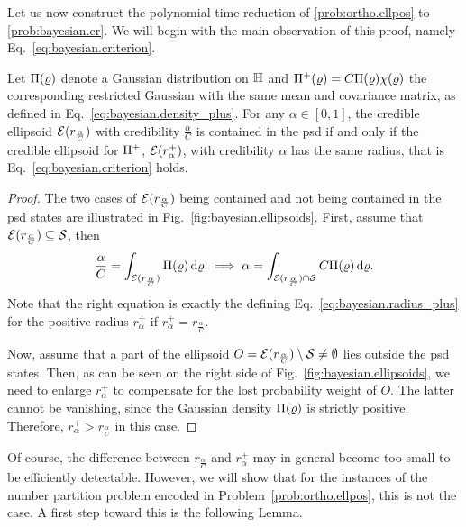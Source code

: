Let us now construct the polynomial time reduction of \cref{prob:ortho.ellpos} to \cref{prob:bayesian.cr}.
We will begin with the main observation of this proof, namely Eq.~\eqref{eq:bayesian.criterion}.
\begin{lemma}\label{lem:bayesian.criterion}
  Let $\Pi(\varrho)$ denote a Gaussian distribution on $\mathbb{H}$ and $\Pi^+(\varrho) = C \Pi(\varrho) \chi(\varrho)$ the corresponding restricted Gaussian with the same mean and covariance matrix, as defined in Eq.~\eqref{eq:bayesian.density_plus}.
  For any $\alpha \in [0,1]$, the credible ellipsoid $\mathcal{E}(r_\frac{\alpha}{C})$ with credibility $\frac{\alpha}{C}$ is contained in the psd if and only if the credible ellipsoid for $\Pi^+$, $\mathcal{E}(r^+_{\alpha})$, with credibility $\alpha$ has the same radius, that is Eq.~\eqref{eq:bayesian.criterion} holds.
\end{lemma}
\begin{proof}
  The two cases of  $\mathcal{E}(r_\frac{\alpha}{C})$ being contained and not being contained in the psd states are illustrated in Fig.~\ref{fig:bayesian.ellipsoids}.
  First, assume that $\mathcal{E}(r_\frac{\alpha}{C}) \subseteq \mathcal{S}$, then
  \[
    \frac{\alpha}{C} = \int_{\mathcal{E}(r_\frac{\alpha}{C})} \Pi(\varrho) \, \mathrm{d} \varrho.
    \implies
    \alpha = \int_{\mathcal{E}(r_\frac{\alpha}{C}) \cap \mathcal{S} } C \Pi(\varrho) \, \mathrm{d} \varrho.
  \]
  Note that the right equation is exactly the defining Eq.~\eqref{eq:bayesian.radius_plus} for the positive radius $r^+_{\alpha}$ if $r^+_\alpha = r_\frac{\alpha}{C}$.

  Now, assume that a part of the ellipsoid $O = \mathcal{E}(r_\frac{\alpha}{C})  \setminus \mathcal{S} \neq \emptyset$ lies outside the psd states.
  Then, as can be seen on the right side of Fig.~\ref{fig:bayesian.ellipsoids}, we need to enlarge $r^+_{\alpha}$ to compensate for the lost probability weight of $O$.
  The latter cannot be vanishing, since the Gaussian density $\Pi(\varrho)$ is strictly positive.
  Therefore, $r^+_\alpha > r_\frac{\alpha}{C}$ in this case.
\end{proof}
Of course, the difference between $r_\frac{\alpha}{C}$ and $r^+_{\alpha}$ may in general become too small to be efficiently detectable.
However, we will show that for the instances of the number partition problem encoded in Problem~\ref{prob:ortho.ellpos}, this is not the case.
A first step toward this is the following Lemma.


